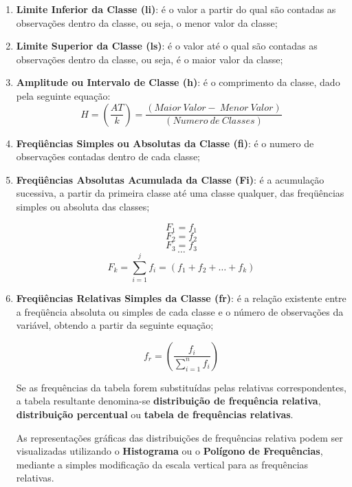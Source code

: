 \begin{enumerate}
Se o número de elementos $n < 25$  utiliza-se o número de classes $k= 5$, se o número de componentes for
$n \geq 25$  utiliza-se o número de classe $k=\sqrt{n}$.
\item \textbf{Limite Inferior da Classe (li)}: é o valor a partir do qual são contadas as observações dentro da classe, ou seja, o menor valor da classe;
\item \textbf{Limite Superior da Classe (ls)}: é o valor até o qual são contadas as observações dentro da classe, ou seja, é o maior valor da classe;
\item \textbf{Amplitude ou Intervalo de Classe (h)}: é o comprimento da classe, dado pela seguinte equação:
\begin{equation}\label{}
H= \left( \frac{AT}{k} \right) = \frac{(Maior \ Valor - \ Menor \ Valor)}{(Numero \ de \ Classes)}
\end{equation}
\item \textbf{Freqüências Simples ou Absolutas da Classe (fi)}: é o numero de observações contadas dentro de cada classe;
\item \textbf{Freqüências Absolutas Acumulada da Classe (Fi)}: é a acumulação sucessiva, a partir da primeira classe até uma classe qualquer, das freqüências simples ou absoluta das classes;

$$ F_{1}= f_{1} $$
$$ F_{2}= f_{2} $$
$$ F_{3}= f_{3} $$
$$ \ldots  $$
$$ F_{k}=  \sum_{i=1}^{j}f_{i} = (f_{1}+f_{2}+\ldots+ f_{k})$$

\item \textbf{Freqüências Relativas Simples da Classe (fr)}: é a relação existente entre a freqüência absoluta ou simples de cada classe e o número de observações da variável, obtendo a partir da seguinte equação;

\begin{equation}\label{}
f_{r} = \left( \frac{f_{i}}{\sum_{i=1}^{n}f_{i}} \right)
\end{equation}

Se as frequências da tabela forem substituídas pelas relativas correspondentes, a tabela resultante denomina-se \textbf{distribuição de frequência relativa}, \textbf{distribuição percentual} ou \textbf{tabela de frequências relativas}.\vskip0.3cm


\newpage
As representações gráficas das distribuições de frequências relativa podem ser visualizadas utilizando o \textbf{Histograma} ou o \textbf{Polígono de Frequências}, mediante a simples modificação da escala vertical para as frequências relativas.


\end{enumerate}
